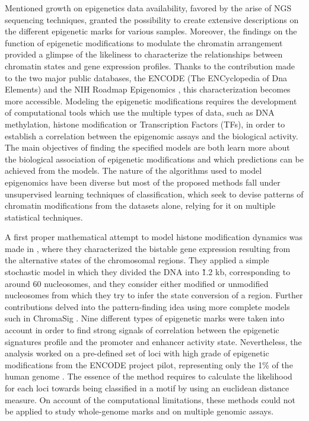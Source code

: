 

Mentioned growth on epigenetics data availability, favored by the arise of NGS sequencing techniques, granted the possibility to create extensive descriptions on the different epigenetic marks for various samples. Moreover, the findings on the function of epigenetic modifications to modulate the chromatin arrangement provided a glimpse of the likeliness to characterize the relationships between chromatin states and gene expression profiles. Thanks to the contribution made to the two major public databases, the ENCODE (The ENCyclopedia of Dna Elements) \cite{Feingold2004} and the NIH Roadmap Epigenomics \cite{Bernstein2010}, this characterization becomes more accessible. Modeling the epigenetic modifications requires the development of computational tools which use the multiple types of data, such as DNA methylation, histone modification or Transcription Factors (TFs), in order to establish a correlation between the epigenomic assays and the biological activity. The main objectives of finding the specified models are both learn more about the biological association of epigenetic modifications and which predictions can be achieved from the models. The nature of the algorithms used to model epigenomics have been diverse but most of the proposed methods fall under unsupervised learning techniques of classification, which seek to devise patterns of chromatin modifications from the datasets alone, relying for it on multiple statistical techniques.

\medskip

A first proper mathematical attempt to model histone modification dynamics was made in \cite{Dodd2007}, where they characterized the bistable gene expression resulting from the alternative states of the chromosomal regions. They applied a simple stochastic model in which they divided the DNA into \~1.2 kb, corresponding to around 60 nucleosomes, and they consider either modified or unmodified nucleosomes from which they try to infer the state conversion of a region. Further contributions delved into the pattern-finding idea using more complete models such in ChromaSig \cite{Hon2008}. Nine different types of epigenetic marks were taken into account in order to find strong signals of correlation between the epigenetic signatures profile and the promoter and enhancer activity state. Nevertheless, the analysis worked on a pre-defined set of loci with high grade of epigenetic modifications from the ENCODE project pilot, representing only the 1\% of the human genome \cite{ENCODEProjectConsortium2007}. The essence of the method requires to calculate the likelihood for each loci towards being classified in a motif by using an euclidean distance measure. On account of the computational limitations, these methods could not be applied to study whole-genome marks and on multiple genomic assays.

